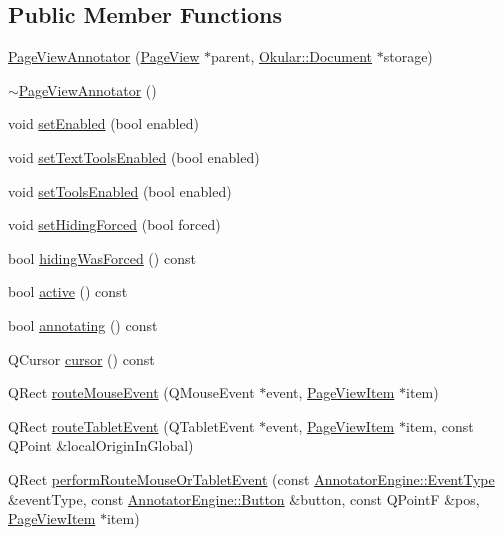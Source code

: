 \subsection*{Public Member Functions}
\begin{DoxyCompactItemize}
\item 
\hyperlink{classPageViewAnnotator_ac743bc259b4f428105d2c8833c511aab}{Page\+View\+Annotator} (\hyperlink{classPageView}{Page\+View} $\ast$parent, \hyperlink{classOkular_1_1Document}{Okular\+::\+Document} $\ast$storage)
\item 
\hyperlink{classPageViewAnnotator_a41206bc7fe97f80e88e10d10b37e38ef}{$\sim$\+Page\+View\+Annotator} ()
\item 
void \hyperlink{classPageViewAnnotator_a69ebe26ffe14871bacc3b8bcb7fae14b}{set\+Enabled} (bool enabled)
\item 
void \hyperlink{classPageViewAnnotator_ad4319944b2ac21b5d93895a9cb691553}{set\+Text\+Tools\+Enabled} (bool enabled)
\item 
void \hyperlink{classPageViewAnnotator_a4cd15f84582b36f2c194530f3a123b69}{set\+Tools\+Enabled} (bool enabled)
\item 
void \hyperlink{classPageViewAnnotator_ad6fed571534b89dfe7d8bee2e6254b26}{set\+Hiding\+Forced} (bool forced)
\item 
bool \hyperlink{classPageViewAnnotator_a0defd62b058f83eb04dc9d298188ab10}{hiding\+Was\+Forced} () const 
\item 
bool \hyperlink{classPageViewAnnotator_ae7fcfee911a4eb7811865863d852ffac}{active} () const 
\item 
bool \hyperlink{classPageViewAnnotator_a7b7e1af0db1184b745f6a294d02148c6}{annotating} () const 
\item 
Q\+Cursor \hyperlink{classPageViewAnnotator_a40f36ee467dc7502940e57bf3cf85f91}{cursor} () const 
\item 
Q\+Rect \hyperlink{classPageViewAnnotator_a6cd952408052c6d7de1c1111d61266b0}{route\+Mouse\+Event} (Q\+Mouse\+Event $\ast$event, \hyperlink{classPageViewItem}{Page\+View\+Item} $\ast$item)
\item 
Q\+Rect \hyperlink{classPageViewAnnotator_a5b8f1d3ac283209cd76838b199adee5d}{route\+Tablet\+Event} (Q\+Tablet\+Event $\ast$event, \hyperlink{classPageViewItem}{Page\+View\+Item} $\ast$item, const Q\+Point \&local\+Origin\+In\+Global)
\item 
Q\+Rect \hyperlink{classPageViewAnnotator_a08cf82846db4ea3fee9c3b786ded22cf}{perform\+Route\+Mouse\+Or\+Tablet\+Event} (const \hyperlink{classAnnotatorEngine_a00fb22eb4cb6eafb056f9066031db133}{Annotator\+Engine\+::\+Event\+Type} \&event\+Type, const \hyperlink{classAnnotatorEngine_ac2e3b75e12bacbb6974d15dd53954567}{Annotator\+Engine\+::\+Button} \&button, const Q\+Point\+F \&pos, \hyperlink{classPageViewItem}{Page\+View\+Item} $\ast$item)

\end{DoxyCompactItemize}
